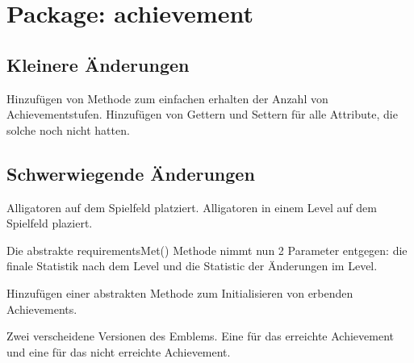 \chapter{Package: achievement}

\section{Kleinere Änderungen}

	\begin{requirements}
		\req[getNumberOfStages]
		Hinzufügen von Methode zum einfachen erhalten der Anzahl von Achievementstufen.
		Hinzufügen von Gettern und Settern für alle Attribute, die solche noch nicht hatten.

	\end{requirements}

\section{Schwerwiegende Änderungen}

	\begin{requirements}
		\begin {requirements}
			\req[AlligatorsPlaced]
			Alligatoren auf dem Spielfeld platziert.
			\req[AlligatorsPlacedPerLevel]
			Alligatoren in einem Level auf dem Spielfeld plaziert.
		\end {requirements}
		
		Die abstrakte requirementsMet() Methode nimmt nun 2 Parameter entgegen: die finale Statistik nach dem Level und die Statistic der Änderungen im Level.		

		Hinzufügen einer abstrakten Methode zum Initialisieren von erbenden Achievements.

		Zwei verscheidene Versionen des Emblems. Eine für das erreichte Achievement und eine für das nicht erreichte Achievement.

	\end{requirements}
